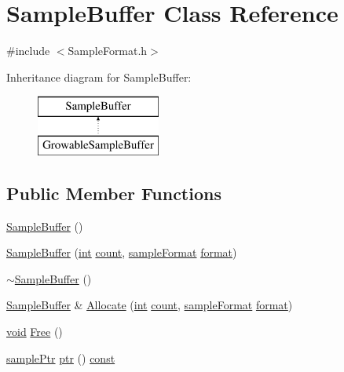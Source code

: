 \hypertarget{class_sample_buffer}{}\section{Sample\+Buffer Class Reference}
\label{class_sample_buffer}


{\ttfamily \#include $<$Sample\+Format.\+h$>$}

Inheritance diagram for Sample\+Buffer\+:\begin{figure}[H]
\begin{center}
\leavevmode
\includegraphics[height=2.000000cm]{class_sample_buffer}
\end{center}
\end{figure}
\subsection*{Public Member Functions}
\begin{DoxyCompactItemize}
\item 
\hyperlink{class_sample_buffer_aaa20344771841121fbb8996837766187}{Sample\+Buffer} ()
\item 
\hyperlink{class_sample_buffer_a382c4f5f61d3859c29115ddff28fdd81}{Sample\+Buffer} (\hyperlink{xmltok_8h_a5a0d4a5641ce434f1d23533f2b2e6653}{int} \hyperlink{metrics_8c_afea6e77db19a2f8c91419904fe665a3a}{count}, \hyperlink{include_2audacity_2_types_8h_a9938d2e2f6adef23e745cd80ef379792}{sample\+Format} \hyperlink{_export_p_c_m_8cpp_a317afff57d87a89158c2b038d37b2b08}{format})
\item 
\hyperlink{class_sample_buffer_a64d5e419ac057af27578cd0466ef8669}{$\sim$\+Sample\+Buffer} ()
\item 
\hyperlink{class_sample_buffer}{Sample\+Buffer} \& \hyperlink{class_sample_buffer_ac099db2fd16e9e472e4036e220be8110}{Allocate} (\hyperlink{xmltok_8h_a5a0d4a5641ce434f1d23533f2b2e6653}{int} \hyperlink{metrics_8c_afea6e77db19a2f8c91419904fe665a3a}{count}, \hyperlink{include_2audacity_2_types_8h_a9938d2e2f6adef23e745cd80ef379792}{sample\+Format} \hyperlink{_export_p_c_m_8cpp_a317afff57d87a89158c2b038d37b2b08}{format})
\item 
\hyperlink{sound_8c_ae35f5844602719cf66324f4de2a658b3}{void} \hyperlink{class_sample_buffer_ae1425d896e27ac0d4abd2327648e9d41}{Free} ()
\item 
\hyperlink{include_2audacity_2_types_8h_aaafb46d1caf7c79262fec96b577215fe}{sample\+Ptr} \hyperlink{class_sample_buffer_a67109e75aa852d6196692e683d248dcd}{ptr} () \hyperlink{getopt1_8c_a2c212835823e3c54a8ab6d95c652660e}{const} 
\end{DoxyCompactItemize}


